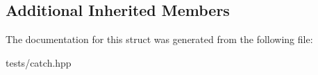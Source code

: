 \subsection*{Additional Inherited Members}


The documentation for this struct was generated from the following file\+:\begin{DoxyCompactItemize}
\item 
tests/catch.\+hpp\end{DoxyCompactItemize}
